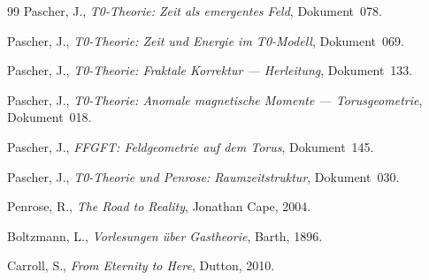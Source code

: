 \begin{thebibliography}{99}
	Pascher, J., \emph{T0-Theorie: Zeit als emergentes Feld}, Dokument~078.
	
	Pascher, J., \emph{T0-Theorie: Zeit und Energie im T0-Modell}, Dokument~069.
	
	Pascher, J., \emph{T0-Theorie: Fraktale Korrektur --- Herleitung}, Dokument~133.
	
	Pascher, J., \emph{T0-Theorie: Anomale magnetische Momente --- Torusgeometrie}, Dokument~018.
	
	Pascher, J., \emph{FFGFT: Feldgeometrie auf dem Torus}, Dokument~145.
	
	Pascher, J., \emph{T0-Theorie und Penrose: Raumzeitstruktur}, Dokument~030.
	
	Penrose, R., \emph{The Road to Reality}, Jonathan Cape, 2004.
	
	Boltzmann, L., \emph{Vorlesungen über Gastheorie}, Barth, 1896.
	
	Carroll, S., \emph{From Eternity to Here}, Dutton, 2010.
\end{thebibliography}
